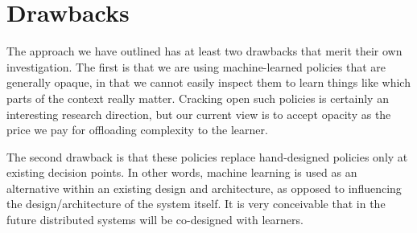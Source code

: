 \documentclass[letterpaper,twocolumn]{article}
\newcommand{\ignore}[1]{}
\begin{document}
\ignore{
An ML agent can be trained offline with pre-labeled data. However, is this
possible in the context of distributed systems? An online learning systems is
more logical in this context, however, how do we quantify the costs of
exploration vs exploitation of learned strategies?
}

\section{Drawbacks}

The approach we have outlined has at least two drawbacks that merit their own
investigation.  The first is that we are using machine-learned policies that are
generally opaque, in that we cannot easily inspect them to learn things like
which parts of the context really matter.  Cracking open such policies is
certainly an interesting research direction, but our current view is to accept
opacity as the price we pay for offloading complexity to the learner.

The second drawback is that these policies replace hand-designed policies only
at existing decision points.  In other words, machine learning is used as an
alternative within an existing design and architecture, as opposed to 
influencing the design/architecture of the system itself.  It is very
conceivable that in the future distributed systems will be co-designed with
learners.

\end{document}
